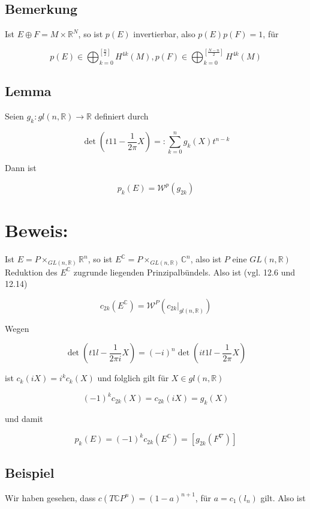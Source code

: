 \documentclass[10pt, letterpaper]{article}
\begin{document}
\subsection*{Bemerkung}
Ist $E \oplus F=M \times \mathbb{R}^{N}$, so ist $p(E)$ invertierbar, also $p(E) p(F)=1$, für

$$
p(E) \in \bigoplus_{k=0}^{\left[\frac{n}{2}\right]} H^{4 k}(M), p(F) \in \bigoplus_{k=0}^{\left[\frac{N-n}{2}\right]} H^{4 k}(M)
$$

\subsection*{Lemma}
Seien $g_{k}: g l(n, \mathbb{R}) \rightarrow \mathbb{R}$ definiert durch

$$
\operatorname{det}\left(t 11-\frac{1}{2 \pi} X\right)=: \sum_{k=0}^{n} g_{k}(X) t^{n-k}
$$

Dann ist

$$
p_{k}(E)=\mathcal{W}^{p}\left(g_{2 k}\right)
$$

\section*{Beweis:}
Ist $E=P \times_{G L(n, \mathbb{R})} \mathbb{R}^{n}$, so ist $E^{\mathbb{C}}=P \times_{G L(n, \mathbb{R})} \mathbb{C}^{n}$, also ist $P$ eine $G L(n, \mathbb{R})$ Reduktion des $E^{\mathbb{C}}$ zugrunde liegenden Prinzipalbündels. Also ist (vgl. 12.6 und 12.14)

$$
c_{2 k}\left(E^{\mathbb{C}}\right)=\mathcal{W}^{P}\left(\left.c_{2 k}\right|_{g l(n, \mathbb{R})}\right)
$$

Wegen

$$
\operatorname{det}\left(t 1 l-\frac{1}{2 \pi i} X\right)=(-i)^{n} \operatorname{det}\left(i t 1 l-\frac{1}{2 \pi} X\right)
$$

ist $c_{k}(i X)=i^{k} c_{k}(X)$ und folglich gilt für $X \in g l(n, \mathbb{R})$

$$
(-1)^{k} c_{2 k}(X)=c_{2 k}(i X)=g_{k}(X)
$$

und damit

$$
p_{k}(E)=(-1)^{k} c_{2 k}\left(E^{\mathbb{C}}\right)=\left[g_{2 k}\left(F^{\nabla}\right)\right]
$$

\subsection*{Beispiel}
Wir haben gesehen, dass $c\left(T \mathbb{C} P^{n}\right)=(1-a)^{n+1}$, für $a=c_{1}\left(l_{n}\right)$ gilt. Also ist
\end{document}
